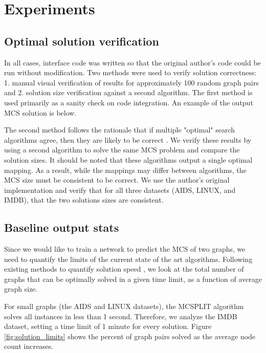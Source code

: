 \section{Experiments}
\subsection{Optimal solution verification}
In all cases, interface code was written so that the original author's code could be run without modification. Two methods were used to verify solution correctness: 1. manual visual verification of results for approximately 100 random graph pairs and 2. solution size verification against a second algorithm. The first method is used primarily as a sanity check on code integration. An example of the output MCS solution is below. 


The second method follows the rationale that if multiple "optimal" search algorithms agree, then they are likely to be correct \cite{korf2014you}. We verify these results by using a second algorithm \cite{mccreesh2016clique} to solve the same MCS problem and compare the solution sizes. It should be noted that these algorithms output a single optimal mapping. As a result, while the mappings may differ between algorithms, the MCS size must be consistent to be correct. We use the author's original implementation and verify that for all three datasets (AIDS, LINUX, and IMDB), that the two solutions sizes are consistent.

\subsection{Baseline output stats}
Since we would like to train a network to predict the MCS of two graphs, we need to quantify the limits of the current state of the art algorithms. Following existing methods to quantify solution speed \cite{hoffmann2018observations}, we look at the total number of graphs that can be optimally solved in a given time limit, as a function of average graph size.

For small graphs (the AIDS and LINUX datasets), the MCSPLIT algorithm solves all instances in less than 1 second. Therefore, we analyze the IMDB dataset, setting a time limit of 1 minute for every solution. Figure \ref{fig:solution_limits} shows the percent of graph pairs solved as the average node count increases. 

